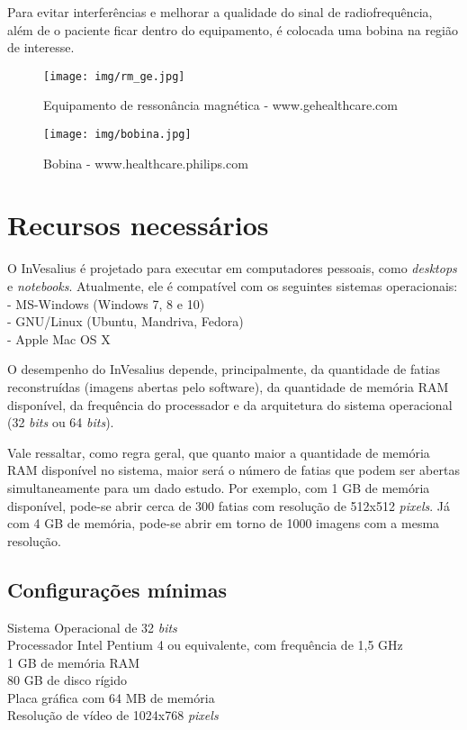 Para evitar interferências e melhorar a qualidade do sinal de radiofrequência, além de o
paciente ficar dentro do equipamento, é colocada uma bobina na região de interesse.

 
\begin{figure}[!htb]
\centering
\texttt{[image: img/rm\_ge.jpg]}
\caption{Equipamento de ressonância magnética - www.gehealthcare.com}
\end{figure}

\begin{figure}[!htb]
\centering
\texttt{[image: img/bobina.jpg]}
\caption{Bobina - www.healthcare.philips.com}
\end{figure}


\section{Recursos necessários}
O InVesalius é projetado para executar em computadores pessoais, como
\textit{desktops} e \textit{notebooks}. Atualmente, ele é compatível com
os seguintes sistemas operacionais:\\
- MS-Windows (Windows 7, 8 e 10)\\
- GNU/Linux (Ubuntu, Mandriva, Fedora)\\
- Apple Mac OS X

O desempenho do InVesalius depende, principalmente, da quantidade de fatias
reconstruídas (imagens abertas pelo software), da quantidade de memória RAM
disponível, da frequência do processador e da arquitetura do sistema operacional
(32 \textit{bits} ou 64 \textit{bits}).

Vale ressaltar, como regra geral, que quanto maior a quantidade de memória RAM
disponível no sistema, maior será o número de fatias que podem ser abertas
simultaneamente para um dado estudo. Por exemplo, com 1 GB de memória disponível,
pode-se abrir cerca de 300 fatias com resolução de 512x512 \textit{pixels}.
Já com 4 GB de memória, pode-se abrir em torno de 1000 imagens com a mesma
resolução.

			
\subsection{Configurações mínimas}
Sistema Operacional de 32 \textit{bits}\\
Processador Intel Pentium 4 ou equivalente, com frequência de 1,5 GHz\\
1 GB de memória RAM\\
80 GB de disco rígido\\
Placa gráfica com 64 MB de memória\\
Resolução de vídeo de 1024x768 \textit{pixels}


